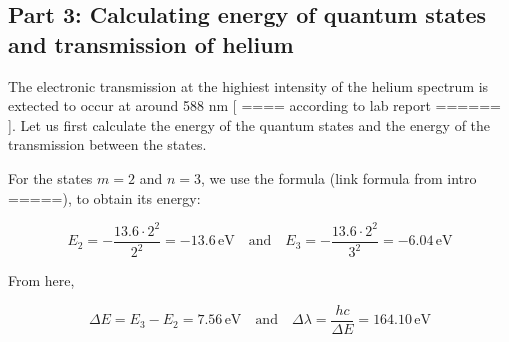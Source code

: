 \subsection{Part 3: Calculating energy of quantum states and transmission of helium}

The electronic transmission at the highiest intensity of the helium spectrum is extected to occur at around 588 nm [ ==== according to lab report ====== ].
Let us first calculate the energy of the quantum states and the energy of the transmission between the states.

For the states $m = 2$ and $n = 3$, we use the formula (link formula from intro =====), to obtain its energy:

\begin{equation}
    E_2 = -\frac{13.6 \cdot 2^2}{2^2} = -13.6 \, \text{eV} \quad \text{and} \quad E_3 = -\frac{13.6 \cdot 2^2}{3^2} = -6.04  \, \text{eV}
\end{equation}

From here,

\begin{equation}
    \Delta E = E_3 - E_2 = 7.56 \, \text{eV} \quad \text{and} \quad \Delta \lambda = \frac{hc}{\Delta E} = 164.10 \, \text{eV}
\end{equation}

